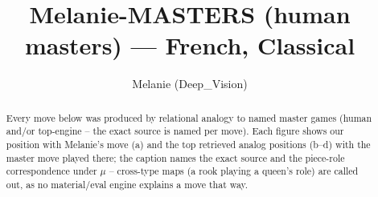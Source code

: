 \documentclass[11pt]{article}
\title{Melanie-MASTERS (human masters) — French, Classical}
\author{Melanie (Deep\_Vision)}
\date{}
\begin{document}
\maketitle

\begin{abstract}Every move below was produced by relational analogy to named master games (human and/or top-engine -- the exact source is named per move). Each figure shows our position with Melanie's move (a) and the top retrieved analog positions (b--d) with the master move played there; the caption names the exact source and the piece-role correspondence under $\mu$ -- cross-type maps (a rook playing a queen's role) are called out, as no material/eval engine explains a move that way.\end{abstract}

\begin{figure}[p]\centering
\begin{subfigure}{0.46\textwidth}\centering
\resizebox{\linewidth}{!}{%
\newchessgame
\chessboard[
  setfen={rnb1k2r/pppnqppp/4p3/3pP3/3P4/2N5/PPP2PPP/R2QKBNR w KQkq - 0 7},
  showmover=false,
  pgfstyle=straightmove, color=movearrow, markmove={d1-e2}
]}
\caption{}
\end{subfigure}\hfill
\begin{subfigure}{0.46\textwidth}\centering
\resizebox{\linewidth}{!}{%
\newchessgame
\chessboard[
  setfen={rn1qkb1r/1p3p2/p2p1np1/3Pp2p/8/1N2BP2/PPP3PP/R2QKB1R w KQkq - 0 11},
  showmover=false,
  pgfstyle=straightmove, color=movearrow, markmove={d1-d2}
]}
\caption{}
\end{subfigure}
\\[4pt]
\begin{subfigure}{0.46\textwidth}\centering
\resizebox{\linewidth}{!}{%
\newchessgame
\chessboard[
  setfen={rn1qkb1r/1p3p2/p2p1np1/3Pp2p/8/1N2BP2/PPP3PP/R2QKB1R w KQkq - 0 11},
  showmover=false,
  pgfstyle=straightmove, color=movearrow, markmove={d1-d2}
]}
\caption{}
\end{subfigure}\hfill
\begin{subfigure}{0.46\textwidth}\centering
\resizebox{\linewidth}{!}{%
\newchessgame
\chessboard[
  setfen={rn1qkb1r/1p3p2/p2p1np1/3Pp2p/8/1N2BP2/PPP3PP/R2QKB1R w KQkq - 0 11},
  showmover=false,
  pgfstyle=straightmove, color=movearrow, markmove={d1-d2}
]}
\caption{}
\end{subfigure}

\end{figure}
\end{document}
